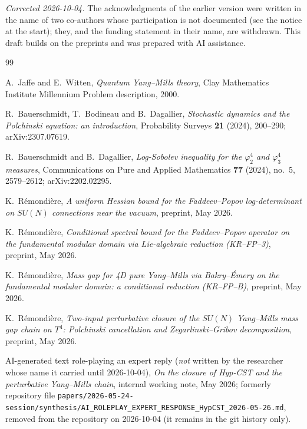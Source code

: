 \documentclass[11pt,a4paper]{amsart}
\theoremstyle{definition}
\begin{document}
\emph{Corrected 2026-10-04.} The acknowledgments of the earlier version were
written in the name of two co-authors whose participation is not documented
(see the notice at the start); they, and the funding statement in their name,
are withdrawn. This draft builds on the preprints \cite{RemondiereKRFP3_2026,
RemondiereKRFPBakryEmery_2026, RemondiereFPHess_2026,
RemondiereClosure2026} and was prepared with AI assistance.

\begin{thebibliography}{99}

A.~Jaffe and E.~Witten,
\emph{Quantum Yang--Mills theory},
Clay Mathematics Institute Millennium Problem description, 2000.

R.~Bauerschmidt, T.~Bodineau and B.~Dagallier,
\emph{Stochastic dynamics and the Polchinski equation: an introduction},
Probability Surveys \textbf{21} (2024), 200--290; arXiv:2307.07619.

R.~Bauerschmidt and B.~Dagallier,
\emph{Log-Sobolev inequality for the $\varphi^4_2$ and $\varphi^4_3$ measures},
Communications on Pure and Applied Mathematics \textbf{77} (2024), no.~5, 2579--2612;
arXiv:2202.02295.

K.~R\'emondi\`ere,
\emph{A uniform Hessian bound for the Faddeev--Popov log-determinant on
$SU(N)$ connections near the vacuum},
preprint, May 2026.

K.~R\'emondi\`ere,
\emph{Conditional spectral bound for the Faddeev--Popov operator on the
fundamental modular domain via Lie-algebraic reduction (KR--FP--3)},
preprint, May 2026.

K.~R\'emondi\`ere,
\emph{Mass gap for 4D pure Yang--Mills via Bakry--\'Emery on the fundamental
modular domain: a conditional reduction (KR--FP--B)},
preprint, May 2026.

K.~R\'emondi\`ere,
\emph{Two-input perturbative closure of the $SU(N)$ Yang--Mills mass gap
chain on $T^4$: Polchinski cancellation and Zegarlinski--Gribov
decomposition},
preprint, May 2026.

AI-generated text role-playing an expert reply (\emph{not} written by the
researcher whose name it carried until 2026-10-04),
\emph{On the closure of Hyp-CST and the perturbative Yang--Mills chain},
internal working note, May 2026; formerly repository file
\texttt{papers/2026-05-24-session/synthesis/AI\_ROLEPLAY\_EXPERT\_RESPONSE\_HypCST\_2026-05-26.md},
removed from the repository on 2026-10-04 (it remains in the git history only).


\end{thebibliography}
\end{document}
